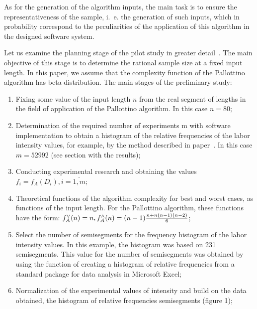 \documentclass[a4paper]{article}
\begin{document}
As for the generation of the algorithm inputs, the main task is to ensure the representativeness of the sample, i.~e. the generation of such inputs, which in probability correspond to the peculiarities of the application of this algorithm in the designed software system.

Let us examine the planning stage of the pilot study in greater detail~\cite{petrushyn_ulyanov_planning}. The main objective of this stage is to determine the rational sample size at a fixed input length. In this paper, we assume that the complexity function of the Pallottino algorithm has beta distribution. The main stages of the preliminary study:

\begin{enumerate}
	\item Fixing some value of the input length $n$ from the real segment of lengths in the field of application of the Pallottino algorithm. In this case $n = 80$;
	
	\item Determination of the required number of experiments m with software implementation to obtain a histogram of the relative frequencies of the labor intensity values, for example, by the method described in paper~\cite{petrushyn_ulyanov_planning}. In this case $m = 52992$ (see section with the results);
	
	\item Conducting experimental research and obtaining the values \\$f_i = f_A(D_i), i = \overline{1, m}$;
	
	\item Theoretical functions of the algorithm complexity for best and worst cases, as functions of the input length. For the Pallottino algorithm, these functions have the form: $f_A^\vee(n) = n, f_A^\wedge(n) = (n - 1){n + n(n - 1)(n - 2) \over{6}}$;
	
	\item Select the number of semisegments for the frequency histogram of the labor intensity values. In this example, the histogram was based on 231 semisegments. This value for the number of semisegments was obtained by using the function of creating a histogram of relative frequencies from a standard package for data analysis in Microsoft Excel;
	
	\item Normalization of the experimental values of intensity and build on the data obtained, the histogram of relative frequencies semisegments (figure 1);
	

\end{enumerate}
\end{document}

